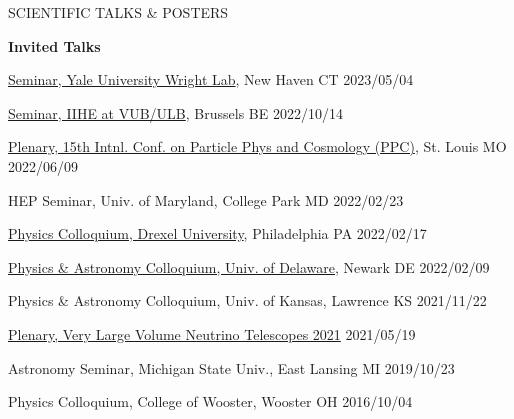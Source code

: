 \documentclass{resume} %
\begin{document}
\begin{rSection}{SCIENTIFIC TALKS \& POSTERS}

{\bf Invited Talks}
\begin{etaremune}

\item \href{https://physics.yale.edu/event/npa-seminar-brian-clark-umd-college-park-chasing-ghost-particle-neutrino-astrophysics-south}{Seminar, Yale University Wright Lab}, New Haven CT  \hfill 2023/05/04

\item \href{https://indico.iihe.ac.be/event/1620/}{Seminar, IIHE at VUB/ULB}, Brussels BE  \hfill 2022/10/14

\item \href{https://indico.cern.ch/event/1126527/contributions/4818939/}{Plenary, 15th Intnl. Conf. on Particle Phys and Cosmology (PPC)}, St. Louis MO  \hfill 2022/06/09

\item HEP Seminar, Univ. of Maryland, College Park MD \hfill 2022/02/23

\item \href{https://drexel.edu/coas/news-events/events-calendar/details/?eid=35304&iid=93965}{Physics Colloquium, Drexel University}, Philadelphia PA  \hfill 2022/02/17

\item \href{https://web.physics.udel.edu/events/colloquium/colloquium-brian-clark}{Physics \& Astronomy Colloquium, Univ. of Delaware}, Newark DE \hfill 2022/02/09

\item Physics \& Astronomy Colloquium, Univ. of Kansas, Lawrence KS \hfill 2021/11/22

\item \href{https://indico.ific.uv.es/event/3965/contributions/14963/}{Plenary, Very Large Volume Neutrino Telescopes 2021} \hfill 2021/05/19

\item Astronomy Seminar, Michigan State Univ., East Lansing MI \hfill 2019/10/23

\item Physics Colloquium, College of Wooster, Wooster OH \hfill 2016/10/04

\end{etaremune}


\end{rSection}
\end{document}
